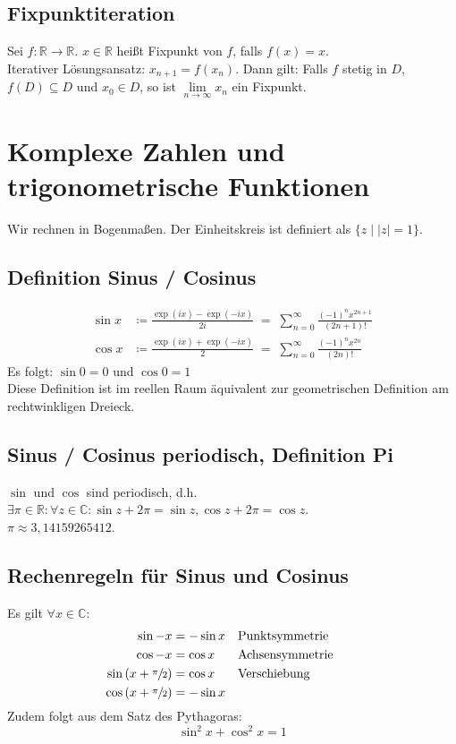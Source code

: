 \documentclass[halfparscip]{scrartcl}
\newcounter{subsection2}
\begin{document}
\subsection*{Fixpunktiteration}
Sei $f : \mathbb{R} \rightarrow \mathbb{R}$. $x \in \mathbb{R}$ heißt Fixpunkt von $f$, falls $f(x) = x$.\\
Iterativer Lösungsansatz: $x_{n+1} = f(x_n)$. Dann gilt: Falls $f$ stetig in $D$, $f(D) \subseteq D$ und $x_0 \in D$, so ist $\lim\limits_{n \rightarrow \infty}x_n$ ein Fixpunkt.

\newpage
\section{Komplexe Zahlen und trigonometrische Funktionen}
Wir rechnen in Bogenmaßen. Der Einheitskreis ist definiert als $\big\{z \;\big\vert\; \vert z\vert = 1\big\}$.

\subsection{Definition Sinus / Cosinus}
\begin{align*}
	\sin x &\coloneqq \frac{\exp(ix) - \exp(-ix)}{2i} \;=\; \sum_{n=0}^{\infty}\frac{(-1)^nx^{2n+1}}{(2n+1)!}\\
	\cos x &\coloneqq \frac{\exp(ix) + \exp(-ix)}{2} \;=\; \sum_{n=0}^{\infty}\frac{(-1)^nx^{2n}}{(2n)!}
\end{align*}
Es folgt: $\sin 0 = 0$ und $\cos 0 = 1$\\
Diese Definition ist im reellen Raum äquivalent zur geometrischen Definition am rechtwinkligen Dreieck.

\subsection{Sinus / Cosinus periodisch, Definition Pi}
$\sin$ und $\cos$ sind periodisch, d.h. $\exists \pi \in \mathbb{R}: \forall z \in \mathbb{C} : \sin z + 2 \pi = \sin z, \cos z + 2\pi = \cos z$.\\
$\pi \approx 3,14159265412$.

\subsection*{Rechenregeln für Sinus und Cosinus}
Es gilt $\forall x \in \mathbb{C}$:
\begin{align*}
	\sin -x                              & = -\sin x  &  & \text{Punktsymmetrie}  &  &  &  &  \\
	\cos -x                              & = \cos x   &  & \text{Achsensymmetrie} &  \\
	\sin \left(x + \sfrac{\pi}{2}\right) & = \cos x   &  & \text{Verschiebung}    &  \\
	\cos \left(x + \sfrac{\pi}{2}\right) & = - \sin x &
\end{align*}
Zudem folgt aus dem Satz des Pythagoras:
\begin{equation*}
	\sin^2 x + \cos^2 x = 1
\end{equation*}
\end{document}
